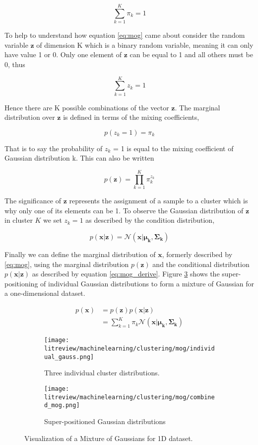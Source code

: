 \[\sum_{k=1}^K\pi_k = 1\]

To help to understand how equation \ref{eq:mog} came about consider the random variable $\boldsymbol{z}$ of dimension K which is a binary random variable, meaning it can only have value 1 or 0. Only one element of $\boldsymbol{z}$ can be equal to 1 and all others must be 0, thus

\[\sum_{k=1}^Kz_k = 1\]

Hence there are K possible combinations of the vector $\boldsymbol{z}$. The marginal distribution over $\boldsymbol{z}$ is defined in terms of the mixing coefficients, 

\[p(z_k = 1) = \pi_k\]

That is to say the probability of $z_k$ = 1 is equal to the mixing coefficient of Gaussian distribution k. This can also be written

\[p(\boldsymbol{z}) = \prod^K_{k=1}\pi^{z_k}_k\]

The significance of $\boldsymbol{z}$ represents the assignment of a sample to a cluster which is why only one of its elements can be 1. To observe the Gaussian distribution of $\boldsymbol{z}$ in cluster $K$ we set $z_k = 1$ as described by the condition distribution,

\[p(\bm{x}|\boldsymbol{z}) = \mathcal{N}(\boldsymbol{x}|\boldsymbol{\mu_k}, \boldsymbol{\Sigma_k}) \]

Finally we can define the marginal distribution of $\boldsymbol{x}$, formerly described by \ref{eq:mog}, using the marginal distribution $p(\boldsymbol{z})$ and the conditional distribution $p(\bm{x}|\bm{z})$ as described by equation \ref{eq:mog_derive}. Figure \ref{fig:mog_compare} shows the super-positioning of individual Gaussian distributions to form a mixture of Gaussian for a one-dimensional dataset.

\begin{align}
	p(\bm{x}) 	&= p(\bm{z})p(\bm{x}|\bm{z})\\
				&= \sum^{K}_{k = 1}\pi_k \mathcal{N}(\boldsymbol{x}|\boldsymbol{\mu_k}, \boldsymbol{\Sigma_k})
\label{eq:mog_derive}
\end{align}


\begin{figure}[htbp]
    \centering
     \begin{subfigure}[b]{0.45\textwidth}
        \texttt{[image: litreview/machinelearning/clustering/mog/individual\_gauss.png]}
	\captionsetup{format = hang}
        \caption{Three individual cluster distributions.}
        \label{fig:mog_singles}
    \end{subfigure} 
    \begin{subfigure}[b]{0.45\textwidth}
        \texttt{[image: litreview/machinelearning/clustering/mog/combined\_mog.png]}	
	\captionsetup{format = hang}
        \caption{Super-positioned Gaussian distributions}
        \label{fig:mog_combined}
    \end{subfigure}
    \captionsetup{format = hang}
    \caption{Visualization of a Mixture of Gaussians for 1D dataset.}
    \label{fig:mog_compare}
\end{figure}




